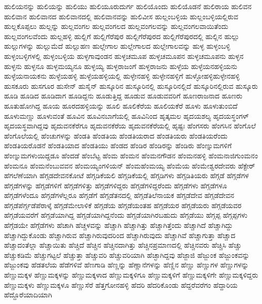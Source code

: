 {ಹುಲಿಯನನ್ನು
ಹುಲಿಯನ್ನು
ಹುಲಿಯು
ಹುಲಿಯೂರುದುರ್ಗ
ಹುಲಿಯೊಂದು
ಹುಲಿಯೊಡನೆ
ಹುಲಿರಾಯ
ಹುಲಿವನ
ಹುಲಿವಾನ
ಹುಲಿವಾನದ
ಹುಲಿವಾನದಲ್ಲಿ
ಹುಲಿವಾನವನ್ನು
ಹುಲಿವೀಸ
ಹುಲ್ಲಂಬಳ್ಳಿಯ
ಹುಲ್ಲಂಬಳ್ಳಿಯಲ್ಲಿರುವ
ಹುಲ್ಲಕೊಪ್ಪಲು
ಹುಲ್ಲನ್ನು
ಹುಲ್ಲವಂಗಲ
ಹುಲ್ಲವಂಗಲದ
ಹುಲ್ಲವಂಗಲವನ್ನು
ಹುಲ್ಲವಂಗಲವಾಯಿತೆಂದು
ಹುಲ್ಲವಂಗಲವೆಂದು
ಹುಲ್ಲಹಳ್ಳಿ
ಹುಲ್ಲಿಗೆ
ಹುಲ್ಲಿಗೆರೆಪುರ
ಹುಲ್ಲಿಗೆರೆಪುರದ
ಹುಲ್ಲಿಗೆರೆಪುರದಲ್ಲಿ
ಹುಲ್ಲಿನ
ಹುಲ್ಲು
ಹುಲ್ಲುಗಳನ್ನು
ಹುಲ್ಲುಮೆದೆ
ಹುಲ್ಲುಹಣ
ಹುಲ್ಲೇಗಾಲ
ಹುಲ್ಲೇಗಾಲದ
ಹುಲ್ಲೇಗಾಲವನ್ನು
ಹುಳ್ಳ
ಹುಳ್ಳಂಬಳ್ಳಿ
ಹುಳ್ಳಂಬಳ್ಳಿಗಳಲ್ಲಿ
ಹುಳ್ಳಂಬಳ್ಳಿಯ
ಹುಳ್ಳಗಾವುಂಡನ
ಹುಳ್ಳಚಮೂಪ
ಹುಳ್ಳಚಮೂಪನ
ಹುಳ್ಳಚಮೂಪನು
ಹುಳ್ಳನ
ಹುಳ್ಳನು
ಹುಳ್ಳನೂ
ಹುಳ್ಳಮಯ್ಯನೂ
ಹುಳ್ಳಯ್ಯ
ಹುಳ್ಳರಾಜಂಗೆ
ಹುಳ್ಳರಾಜನು
ಹುಳ್ಳೆಯ
ಹುಳ್ಳೆಯನಹಳ್ಳಿಯನು
ಹುಳ್ಳೆಯನಾಯಕನು
ಹುಳ್ಳೆಯಹಳ್ಳಿ
ಹುಳ್ಳೆಯಹಳ್ಳಿಯಲ್ಲಿ
ಹುಳ್ಳೇನಹಳ್ಳಿ
ಹುಳ್ಳೇನಹಳ್ಳಿಗೆ
ಹುಳ್ಳೋಹಳ್ಳಿಹುಳ್ಳೇನಹಳ್ಳಿ
ಹುಸಕೂರು
ಹುಸಗೂರ
ಹುಸೇನ್
ಹುಸೈನ್
ಹುಸ್ಕೂರಿನ
ಹುಸ್ಕೂರಿನಲ್ಲಿ
ಹುಸ್ಕೂರಿನಲ್ಲಿದೆ
ಹುಸ್ಕೂರಿನಲ್ಲಿರುವ
ಹುಸ್ಕೂರು
ಹೂಡಿ
ಹೂಡಿದ
ಹೂಡಿದಾಗ
ಹೂಡಿದ್ದನು
ಹೂಡುತ್ತಿದ್ದ
ಹೂಡುವ
ಹೂಡುವವರಿಗೆ
ಹೂಣರಾಜನಾದ
ಹೂಣರು
ಹೂತುಹೋಗಿದ್ದ
ಹೂಯ
ಹೂರದಹಳ್ಳಿಯನ್ನು
ಹೂಲಿ
ಹೂಲಿಕೆರೆಯ
ಹೂಲಿಯಕೆರೆ
ಹೂಳು
ಹೂಳುತುಂಬಿದೆ
ಹೂಳುಮಣ್ಣು
ಹೂಳುವಂತೆ
ಹೂವಿನ
ಹೂವಿನಬಾಗೆಯಲ್ಲಿ
ಹೂವಿನಿಂದ
ಹೃತ್ಕಮಲ
ಹೃದಯಶಲ್ಯ
ಹೃದಯಸ್ಥಂಗಳ್
ಹೃದಯಸ್ಥವಾಗಿದ್ದವು
ಹೃದುವನಕೆರೆಗೂ
ಹೃದುವನಕೆರೆಯ
ಹೃದುವನಕೆರೆಯಲ್ಲಿ
ಹೃಷ್ಟಃ
ಹೆಂಗಸರು
ಹೆಂಗಸಿನ
ಹೆಂಗೊಲೆ
ಹೆಂಗೊಲೆಯಲ್ಲಿ
ಹೆಂಚುಗಳನ್ನು
ಹೆಂಡತಿ
ಹೆಂಡತಿಯ
ಹೆಂಡತಿಯರಾದ
ಹೆಂಡತಿಯರು
ಹೆಂಡತಿಯರೆಂದು
ಹೆಂಡತಿಯರೊಡನೆ
ಹೆಂಡತಿಯಾದ
ಹೆಂಡತಿಯು
ಹೆಂಡದ
ಹೆಂಡಿರ
ಹೆಂಡಿರನ್ನು
ಹೆಂಡಿರು
ಹೆಂಣ್ನುಮಗಳಿಗೆ
ಹೆಂಣ್ನುಮಗಳುಯಿದ್ದಡೂ
ಹೆಂದಡೆ
ಹೆಂಬೆಟ್ಟ
ಹೆಂಮ
ಹೆಂಮನ
ಹೆಂಮನಗೌಡನ
ಹೆಂಮನಹಳ್ಳಿ
ಹೆಂಮನಾಜಿಗುಂಮನಂ
ಹೆಂಮನೂ
ಹೆಂಮನೆಂಬುವವನ
ಹೆಂಮಯ್ಯಂಗಳಿಯನ್
ಹೆಂಮಹೆಂಮಯ್ಯ
ಹೆಂಮೆಯ
ಹೆಂಮೇಶ್ವರದೇವರು
ಹೆಕ್ಟೇರ್
ಹೆಗಲೆಣೆಯಾಗಿ
ಹೆಗ್ಗಡದೇವನಕೋಟೆ
ಹೆಗ್ಗಡಿಕೆಯಲಿ
ಹೆಗ್ಗಡಿಕೆಯಲ್ಲಿ
ಹೆಗ್ಗಡಿಗಳು
ಹೆಗ್ಗಡಿತಿಯರು
ಹೆಗ್ಗಡೆ
ಹೆಗ್ಗಡೆಗಳ
ಹೆಗ್ಗಡೆಗಳನ್ನು
ಹೆಗ್ಗಡೆಗಳಿಗೆ
ಹೆಗ್ಗಡೆಗಳಿತ್ತು
ಹೆಗ್ಗಡೆಗಳಿದ್ದರು
ಹೆಗ್ಗಡೆಗಳಿದ್ದರೆಂದು
ಹೆಗ್ಗಡೆಗಳು
ಹೆಗ್ಗಡೆಗಳೂ
ಹೆಗ್ಗಡೆಗಳೆಂದೂ
ಹೆಗ್ಗಡೆಗಳೆಲ್ಲರೂ
ಹೆಗ್ಗಡೆಗೆ
ಹೆಗ್ಗಡೆತನದಲ್ಲಿ
ಹೆಗ್ಗಡೆತಿಲೆನಾಯಕ
ಹೆಗ್ಗಡೆದೇವ
ಹೆಗ್ಗಡೆದೇವನ
ಹೆಗ್ಗಡೆಪೆರ್ಗ್ಗಡೆಪೆರಾಳ್ಕೆ
ಹೆಗ್ಗಡೆಮೇಲಾಳಿಕೆ
ಹೆಗ್ಗಡೆಯ
ಹೆಗ್ಗಡೆಯಂತಹ
ಹೆಗ್ಗಡೆಯರ
ಹೆಗ್ಗಡೆಯರು
ಹೆಗ್ಗಡೆಯವರ
ಹೆಗ್ಗಡೆಯವರೆಗೆ
ಹೆಗ್ಗಡೆಯಾಗಿದ್ದ
ಹೆಗ್ಗಡೆಯಾಗಿದ್ದನೆಂದು
ಹೆಗ್ಗಡೆಯಾಗಿರಬಹುದು
ಹೆಗ್ಗಡೆಯು
ಹೆಗ್ಗಪ್ಪ
ಹೆಗ್ಗಪ್ಪಗಳು
ಹೆಗ್ಗೆಡಯೇ
ಹೆಗ್ಗೆಡೆಗಳು
ಹೆಚಾಗಿ
ಹೆಚ್ಚಳವನ್ನು
ಹೆಚ್ಚಾಗಿ
ಹೆಚ್ಚಾಗಿತ್ತು
ಹೆಚ್ಚಾಗಿತ್ತೆಂದು
ಹೆಚ್ಚಾಗಿದೆ
ಹೆಚ್ಚಾಗಿದ್ದು
ಹೆಚ್ಚಾಗಿದ್ದುಕೊಂಡು
ಹೆಚ್ಚಾಗಿರುವ
ಹೆಚ್ಚಾಗಿರುವುದರಿಂದ
ಹೆಚ್ಚಾಗಿರುವುದು
ಹೆಚ್ಚಾಗಿವೆ
ಹೆಚ್ಚಾಗುತ್ತಾ
ಹೆಚ್ಚಾದ
ಹೆಚ್ಚಾದಂತೆಲ್ಲಾ
ಹೆಚ್ಚಾಯಿತು
ಹೆಚ್ಚಿದೆ
ಹೆಚ್ಚಿನ
ಹೆಚ್ಚಿನದಾಗಿತ್ತು
ಹೆಚ್ಚಿನಪ್ರಮಾಣದಲ್ಲಿ
ಹೆಚ್ಚಿನವರು
ಹೆಚ್ಚಿಸಿ
ಹೆಚ್ಚು
ಹೆಚ್ಚುಕಡಿಮೆ
ಹೆಚ್ಚುಗಟ್ಟಲೆ
ಹೆಚ್ಚುತ್ತಾ
ಹೆಚ್ಚುವರಿ
ಹೆಚ್ಚುವರಿಯಾಗಿ
ಹೆಚ್ಛಾಗಿದ್ದವು
ಹೆಜ್ಜಾಜಿ
ಹೆಜ್ಜುಂಕ
ಹೆಜ್ಜುಂಕವನ್ನು
ಹೆಜ್ಜುಂಕವು
ಹೆಡತಲೆಯ
ಹೆಡೆಗಳಿವೆ
ಹೆಣಗಾಡಿ
ಹೆಣ್ಣನ್ನು
ಹೆಣ್ಣಾನೆಗಳನ್ನು
ಹೆಣ್ಣಿನ
ಹೆಣ್ಣು
ಹೆಣ್ಣುಗಳ
ಹೆಣ್ಣುಗಳನ್ನು
ಹೆಣ್ಣುಮಕ್ಕಳ
ಹೆಣ್ಣುಮಕ್ಕಳನ್ನು
ಹೆಣ್ಣುಮಕ್ಕಳಾದ
ಹೆಣ್ಣುಮಕ್ಕಳಿಗೂ
ಹೆಣ್ಣುಮಕ್ಕಳಿಗೆ
ಹೆಣ್ಣುಮಕ್ಕಳಿಗೇ
ಹೆಣ್ಣುಮಕ್ಕಳಿದ್ದರು
ಹೆಣ್ಣುಮಕ್ಕಳು
ಹೆಣ್ಣುಮಕ್ಕಳೂ
ಹೆಣ್ಣುಸೆರೆ
ಹೆತ್ತಗೋನಹಳ್ಳಿ
ಹೆದರಿ
ಹೆದರಿಕೊಂಡು
ಹೆದ್ದರೆವರೆಗಂ
ಹೆದ್ದಾರಿಯ
ಹೆದ್ದೊರೆಯಾದಿಯಾಗಿ
}
